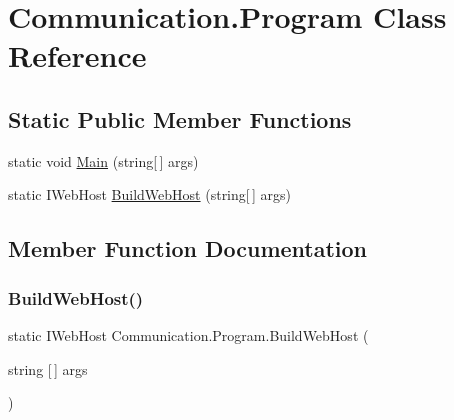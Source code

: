 \hypertarget{class_communication_1_1_program}{}\section{Communication.\+Program Class Reference}
\label{class_communication_1_1_program}
\subsection*{Static Public Member Functions}
\begin{DoxyCompactItemize}
\item 
static void \mbox{\hyperlink{class_communication_1_1_program_ac0cd332e18198a8adedd2a9528125066}{Main}} (string\mbox{[}$\,$\mbox{]} args)
\item 
static I\+Web\+Host \mbox{\hyperlink{class_communication_1_1_program_ae9258975c5244946fb3a7bde28f878e1}{Build\+Web\+Host}} (string\mbox{[}$\,$\mbox{]} args)
\end{DoxyCompactItemize}


\subsection{Member Function Documentation}
\mbox{\label{class_communication_1_1_program_ae9258975c5244946fb3a7bde28f878e1}} 
\subsubsection{\texorpdfstring{Build\+Web\+Host()}{BuildWebHost()}}
{\footnotesize\ttfamily static I\+Web\+Host Communication.\+Program.\+Build\+Web\+Host (\begin{DoxyParamCaption}\item[{string \mbox{[}$\,$\mbox{]}}]{args }\end{DoxyParamCaption})\hspace{0.3cm}{\ttfamily [static]}}

\mbox{\label{class_communication_1_1_program_ac0cd332e18198a8adedd2a9528125066}} 
